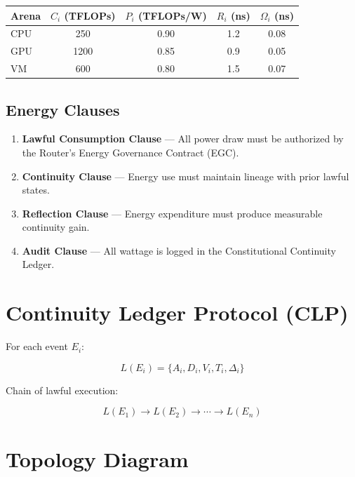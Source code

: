 \documentclass[10pt,a4paper]{article}
\begin{document}
\begin{center}
\begin{tabular}{lcccc}
\toprule
Arena & \(C_i\) (TFLOPs) & \(P_i\) (TFLOPs/W) & \(R_i\) (ns) & \(\Omega_i\) (ns) \\
\midrule
CPU  & 250   & 0.90 & 1.2 & 0.08 \\
GPU  & 1200  & 0.85 & 0.9 & 0.05 \\
VM   & 600   & 0.80 & 1.5 & 0.07 \\
\bottomrule
\end{tabular}
\end{center}

\subsection{Energy Clauses}
\begin{enumerate}
  \item \textbf{Lawful Consumption Clause} — All power draw must be authorized by the Router's Energy Governance Contract (EGC).
  \item \textbf{Continuity Clause} — Energy use must maintain lineage with prior lawful states.
  \item \textbf{Reflection Clause} — Energy expenditure must produce measurable continuity gain.
  \item \textbf{Audit Clause} — All wattage is logged in the Constitutional Continuity Ledger.
\end{enumerate}

\section{Continuity Ledger Protocol (CLP)}

For each event \(E_i\):

\[
L(E_i) = \{ A_i, D_i, V_i, T_i, \Delta_i \}
\]

Chain of lawful execution:

\[
L(E_1) \rightarrow L(E_2) \rightarrow \cdots \rightarrow L(E_n)
\]

\section{Topology Diagram}
\end{document}
